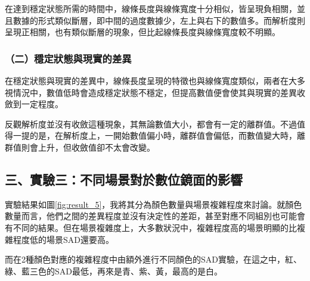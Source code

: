 \documentclass[12pt]{article}
\begin{document}
在達到穩定狀態所需的時間中，線條長度與線條寬度十分相似，皆呈現負相關，並且數據的形式類似斷層，即中間的過度數據少，左上與右下的數值多。而解析度則呈現正相關，也有類似斷層的現象，但比起線條長度與線條寬度較不明顯。

\subsubsection{（二）穩定狀態與現實的差異}

在穩定狀態與現實的差異中，線條長度呈現的特徵也與線條寬度類似，兩者在大多視情況中，數值低時會造成穩定狀態不穩定，但提高數值便會使其與現實的差異收斂到一定程度。

反觀解析度並沒有收斂這種現象，其無論數值大小，都會有一定的離群值。不過值得一提的是，在解析度上，一開始數值偏小時，離群值會偏低，而數值變大時，離群值則會上升，但收斂值卻不太會改變。

\newpage
\subsection{三、實驗三：不同場景對於數位鏡面的影響}

實驗結果如圖\ref{fig:result_5}，我將其分為顏色數量與場景複雜程度來討論。就顏色數量而言，他們之間的差異程度並沒有決定性的差距，甚至對應不同組別也可能會有不同的結果。但在場景複雜度上，大多數狀況中，複雜程度高的場景明顯的比複雜程度低的場景SAD還要高。

而在2種顏色對應的複雜程度中由額外進行不同顏色的SAD實驗，在這之中，紅、綠、藍三色的SAD最低，再來是青、紫、黃，最高的是白。
\end{document}
